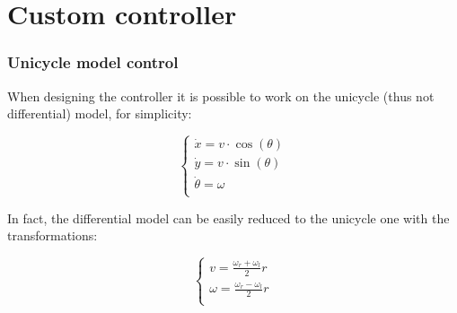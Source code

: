\documentclass{beamer}
\begin{document}

\section{Custom controller}


\begin{frame}
\frametitle{Unicycle model control}

When designing the controller it is possible to work on the unicycle (thus not differential) model, for simplicity:

$$
\begin{cases}
    \dot{x} = v \cdot \cos(\theta) \\
    \dot{y} = v \cdot \sin(\theta) \\
    \dot{\theta} = \omega \\
\end{cases}
$$

\vspace{2em}

In fact, the differential model can be easily reduced to the unicycle one with the transformations:

$$
\begin{cases}
    v = {\frac {\omega_r + \omega_l}{2} r} \\
    \omega = {\frac {\omega_r - \omega_l}{2} r} \\
\end{cases}
$$

\end{frame}

\end{document}
